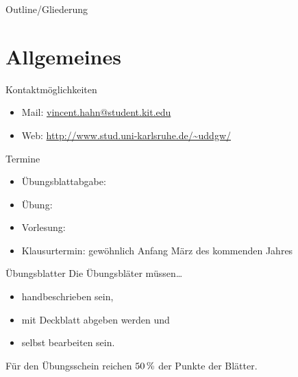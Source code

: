 
\subtitle{Foliensatz 01}
\date{25. Oktober 2012}



\begin{frame}
\titlepage
\end{frame}

\begin{frame}{Outline/Gliederung}
\tableofcontents
\end{frame}

\section{Allgemeines}
\begin{frame}{Kontaktmöglichkeiten}
\begin{itemize}
    \item Mail: \href{mailto:vincent.hahn@student.kit.edu}{vincent.hahn@student.kit.edu}
\pause
    \item Web: \url{http://www.stud.uni-karlsruhe.de/~uddgw/}
\end{itemize}
\end{frame}

\begin{frame}{Termine}
    \begin{itemize}
    \item Übungsblattabgabe:
    \pause
    \item Übung: 
    \item Vorlesung: 
    \pause
    \item Klausurtermin: gewöhnlich Anfang März des kommenden Jahres
    \end{itemize}
\end{frame}

\begin{frame}{Übungsblatter}
    Die Übungsbläter müssen\dots
    \begin{itemize}
        \item handbeschrieben sein,
        \item mit Deckblatt abgeben werden und
        \item selbst bearbeiten sein.
    \end{itemize}
    Für den Übungsschein reichen $\unit[50]{\%}$ der Punkte der Blätter.
\end{frame}

